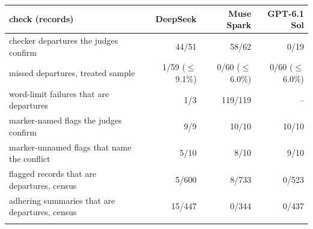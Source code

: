 \begin{tabular*}{\textwidth}{@{\extracolsep\fill}lrrr@{}}
\toprule
check (records) & DeepSeek & Muse Spark & GPT-6.1 Sol \\
\midrule
checker departures the judges confirm & 44/51 & 58/62 & 0/19 \\
missed departures, treated sample & 1/59 ($\le$9.1\%) & 0/60 ($\le$6.0\%) & 0/60 ($\le$6.0\%) \\
word-limit failures that are departures & 1/3 & 119/119 & -- \\
marker-named flags the judges confirm & 9/9 & 10/10 & 10/10 \\
marker-unnamed flags that name the conflict & 5/10 & 8/10 & 9/10 \\
flagged records that are departures, census & 5/600 & 8/733 & 0/523 \\
adhering summaries that are departures, census & 15/447 & 0/344 & 0/437 \\
\botrule
\end{tabular*}
